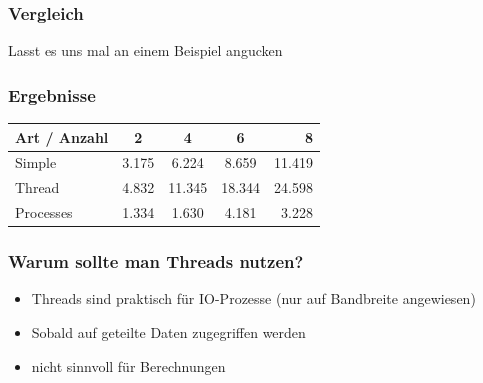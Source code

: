 \documentclass[12pt,utf8, handout]{beamer}
\begin{document}
\begin{frame}
\frametitle{Vergleich}
Lasst es uns mal an einem Beispiel angucken
\end{frame}

\begin{frame}
\frametitle{Ergebnisse}
\begin{tabular}{l | c | c | c | r}
Art / Anzahl & 2 & 4 & 6 & 8 \\ \hline
Simple & 3.175 & 6.224 & 8.659 & 11.419 \\ \hline
Thread & 4.832 & 11.345 & 18.344 & 24.598 \\ \hline
Processes & 1.334 & 1.630 & 4.181 & 3.228 \\
\end{tabular}
\end{frame}

\begin{frame}
\frametitle{Warum sollte man Threads nutzen?}
\begin{itemize}
	\item Threads sind praktisch für IO-Prozesse (nur auf Bandbreite angewiesen)
	\item Sobald auf geteilte Daten zugegriffen werden
	\item nicht sinnvoll für Berechnungen
\end{itemize}
\end{frame}
\end{document}
